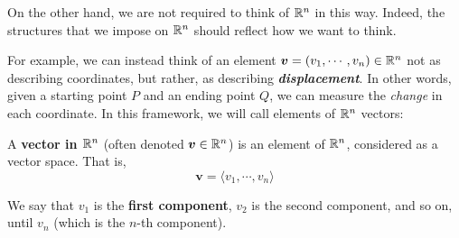 On the other hand, we are not required to think of $\mathbb{R}^n$ in this way.  Indeed, the structures that we impose on $\mathbb{R}^n$ should reflect how we want to think.

For example, we can instead think of an element $\bm{v} = (v_1, \cdots, v_n) \in \mathbb{R}^n$ not as describing coordinates, but rather, as describing \textit{\textbf{displacement}}.  In other words, given a starting point $P$ and an ending point $Q$, we can measure the \textit{change} in each coordinate.  In this framework, we will call elements of $\mathbb{R}^n$ vectors:

\begin{definition}
A \textbf{vector in $\mathbb{R}^n$} (often denoted $\bm{v} \in \mathbb{R}^n$) is an element of $\mathbb{R}^n$, considered as a vector space.  That is,
$$\bm{v} = \langle v_1, \cdots, v_n \rangle$$

We say that $v_1$ is the \textbf{first component}, $v_2$ is the second component, and so on, until $v_n$ (which is the $n$-th component).
\end{definition}



